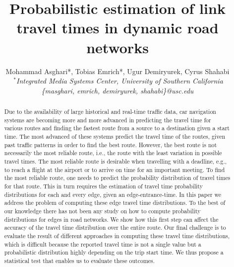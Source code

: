 \documentclass[]{sig-alternate}
\title{Probabilistic estimation of link travel times in dynamic road networks}
\author{{Mohammad Asghari*, Tobias Emrich*, Ugur Demiryurek, Cyrus Shahabi}
  \vspace{1.6mm}\\
  \fontsize{10}{10}\selectfont\rmfamily\itshape
  $~^{*}$Integrated Media Systems Center, University of Southern California\\
  \fontsize{9}{9}\selectfont\ttfamily\upshape
  \{masghari, emrich, demiryurek, shahabi\}@usc.edu
}
\begin{document}
\maketitle

\begin{abstract}

Due to the availability of large historical and real-time traffic data, car navigation systems are becoming more and more advanced in predicting the travel time for various routes and finding the fastest route from a source to a destination given a start time.  The most advanced of these systems predict the travel time of the routes, given past traffic patterns in order to find the best route. However, the best route is not necessarily the most reliable route, i.e., the route with the least variation in possible travel times. The most reliable route is desirable when travelling with a deadline, e.g., to reach a flight at the airport or to arrive on time for an important meeting.  To find the most reliable route, one needs to predict the probability distribution of travel times for that route. This in turn requires the estimation of travel time probability distributions for each and every edge, given an edge-entrance-time. In this paper we address the problem of computing these edge travel time distributions. To the best of our knowledge there has not been any study on how to compute probability distributions for edges in road networks. We show how this first step can affect the accuracy of the travel time distribution over the entire route. Our final challenge is to evaluate the result of different approaches in computing these travel time distributions, which is difficult because the reported travel time is not a single value but a probabilistic distribution highly depending on the trip start time.  We thus propose a statistical test that enables us to evaluate these outcomes.

\end{abstract}










\begin{scriptsize}


\end{scriptsize}
\end{document}
